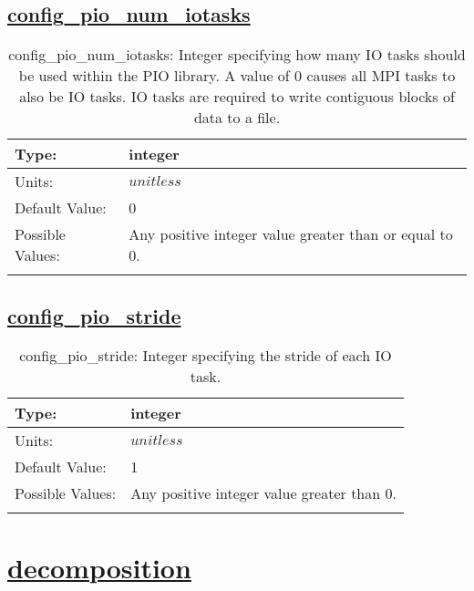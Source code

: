 \subsection[config\_pio\_num\_iotasks]{\hyperref[sec:nm_tab_io]{config\_pio\_num\_iotasks}}
\label{subsec:nm_sec_config_pio_num_iotasks}
\begin{center}
\begin{longtable}{| p{2.0in} | p{4.0in} |}
    \hline
    Type: & integer \\
    \hline
    Units: & $unitless$ \\
    \hline
    Default Value: & 0 \\
    \hline
    Possible Values: & Any positive integer value greater than or equal to 0. \\
    \hline
    \caption{config\_pio\_num\_iotasks: Integer specifying how many IO tasks should be used within the PIO library. A value of 0 causes all MPI tasks to also be IO tasks. IO tasks are required to write contiguous blocks of data to a file.}
\end{longtable}
\end{center}
\subsection[config\_pio\_stride]{\hyperref[sec:nm_tab_io]{config\_pio\_stride}}
\label{subsec:nm_sec_config_pio_stride}
\begin{center}
\begin{longtable}{| p{2.0in} | p{4.0in} |}
    \hline
    Type: & integer \\
    \hline
    Units: & $unitless$ \\
    \hline
    Default Value: & 1 \\
    \hline
    Possible Values: & Any positive integer value greater than 0. \\
    \hline
    \caption{config\_pio\_stride: Integer specifying the stride of each IO task.}
\end{longtable}
\end{center}
\section[decomposition]{\hyperref[sec:nm_tab_decomposition]{decomposition}}
\label{sec:nm_sec_decomposition}
